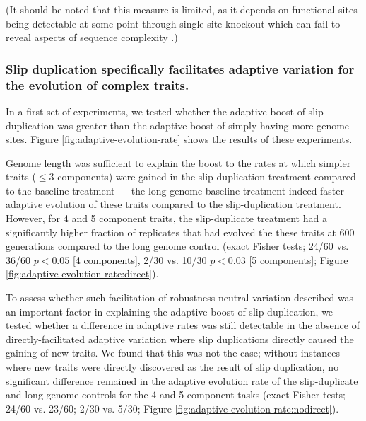 (It should be noted that this measure is limited, as it depends on functional sites being detectable at some point through single-site knockout which can fail to reveal aspects of sequence complexity \citep{alifeextendedabstract}.)

\subsubsection{Slip duplication specifically facilitates adaptive variation for the evolution of complex traits.}



In a first set of experiments, we tested whether the adaptive boost of slip duplication was greater than the adaptive boost of simply having more genome sites.
Figure \ref{fig:adaptive-evolution-rate} shows the results of these experiments.

Genome length was sufficient to explain the boost to the rates at which simpler traits ($\leq 3$ components) were gained in the slip duplication treatment compared to the baseline treatment --- the long-genome baseline treatment indeed faster adaptive evolution of these traits compared to the slip-duplication treatment.
However, for 4 and 5 component traits, the slip-duplicate treatment had a significantly higher fraction of replicates that had evolved the these traits at 600 generations compared to the long genome control (exact Fisher tests; 24/60 vs. 36/60 $p<0.05$ [4 components], 2/30 vs. 10/30 $p < 0.03$ [5 components]; Figure \ref{fig:adaptive-evolution-rate:direct}).

To assess whether such facilitation of robustness neutral variation described  was an important factor in explaining the adaptive boost of slip duplication, we tested whether a difference in adaptive rates was still detectable in the absence of directly-facilitated adaptive variation where slip duplications directly caused the gaining of new traits.
We found that this was not the case; without instances where new traits were directly discovered as the result of slip duplication, no significant difference remained in the adaptive evolution rate of the slip-duplicate and long-genome controls for the 4 and 5 component tasks (exact Fisher tests; 24/60 vs. 23/60; 2/30 vs. 5/30; Figure \ref{fig:adaptive-evolution-rate:nodirect}).

